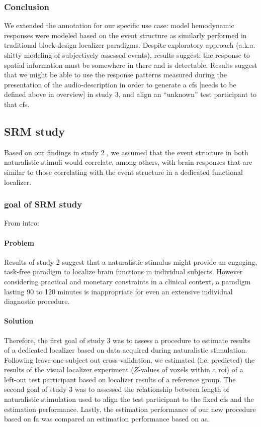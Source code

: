\subsubsection{Conclusion}
%
We extended the annotation for our specific use case:
%
model hemodynamic responses were modeled based on the event structure as
similarly performed in traditional block-design localizer paradigms.
%
Despite exploratory approach (a.k.a. shitty modeling of subjectively assessed
events), results suggest:
%
the response to spatial information must be somewhere in there and is
detectable.
%
Results suggest that we might be able to use the response patterns
measured during the presentation of the audio-description in order to generate a
\ac{cfs} [needs to be defined above in overview] in study 3, and
align an ``unknown'' test participant to that \ac{cfs}.


\subsection{SRM study}

Based on our findings in study 2 \citep{haeusler2022processing}, we assumed that
the event structure in both naturalistic stimuli would correlate, among others,
with brain responses that are similar to those correlating with the event
structure in a dedicated functional localizer.

\subsubsection{goal of SRM study}

From intro:
\paragraph{Problem}
Results of study 2 suggest that a naturalistic stimulus might provide an
engaging, task-free paradigm to localize brain functions in individual subjects.
%
However considering practical and monetary constraints in a clinical context, a
paradigm lasting 90 to 120 minutes is inappropriate for even an extensive
individual diagnostic procedure.


\paragraph{Solution}
%
Therefore, the first goal of study 3 was to assess a procedure to estimate
results of a dedicated localizer \citep{sengupta2016extension} based on data
acquired during naturalistic stimulation.
%
Following leave-one-subject out cross-validation, we estimated (i.e. predicted)
the results of the visual localizer experiment ($Z$-values of voxels within a
\ac{roi}) of a left-out test participant based on localizer results of a
reference group.
The second goal of study 3 was to assessed the relationship between length of
naturalistic stimulation used to align the test participant to the fixed
\ac{cfs} and the estimation performance.
%
Lastly, the estimation performance of our new procedure based on \ac{fa} was
compared an estimation performance based on \ac{aa}.


